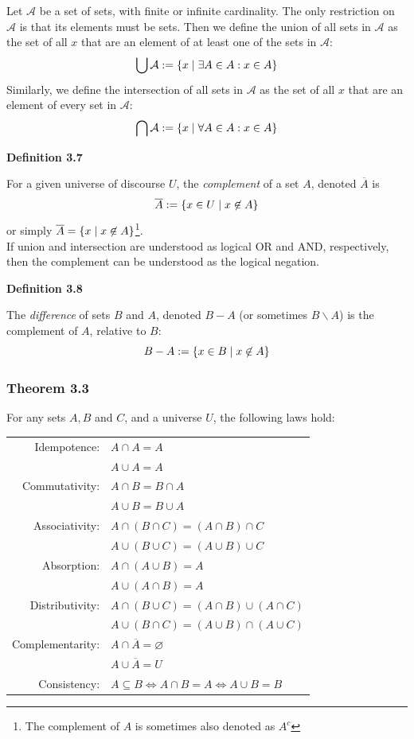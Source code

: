 \documentclass[a4paper]{report}
\newenvironment{definition}[1]{\begin{framed}\centerline{\textbf{Definition #1}}\noindent\hspace{-1.1mm}}{\end{framed}}
\DeclarePairedDelimiter\cur{\{}{\}}
\newcommand{\A}{\mathcal{A}}
\begin{document}
Let $\A$ be a set of sets, with finite or infinite cardinality. The only restriction on $\A$ is that its elements must be sets. Then we define the union of all sets in $\A$ as the set of all $x$ that are an element of at least one of the sets in $\A$:
\[\bigcup {\A} :=\cur{x\mid\exists A\in A:x\in A}\]
Similarly, we define the intersection of all sets in $\A$ as the set of all $x$ that are an element of every set in $\A$:
\[\bigcap {\A} :=\cur{x\mid\forall A\in A:x\in A}\]

\begin{definition}{3.7}
For a given universe of discourse $U$, the \emph{complement} of a set $A$, denoted $\overline{A}$ is \[\overline{A}:=\cur{x\in U\mid x\not\in A}\] or simply $\overline{A}=\cur{x\mid x\not\in A}$\footnote{The complement of $A$ is sometimes also denoted as $A^c$}.\\

If union and intersection are understood as logical OR and AND, respectively, then the complement can be understood as the logical negation.
\end{definition}

\begin{definition}{3.8}
The \emph{difference} of sets $B$ and $A$, denoted $B-A$ (or sometimes $B\backslash A$) is the complement of $A$, relative to $B$: \[B-A:=\cur{x\in B\mid x\not\in A}\] 
\end{definition}

\subsubsection*{Theorem 3.3}
For any sets $A,B$ and $C$, and a universe $U$, the following laws hold:\\
\begin{center}
\begin{tabular}{r l}
Idempotence: & $A\cap A=A$ \\
{}& $A\cup A=A$\\
Commutativity: & $A\cap B=B\cap A$\\
{}&$A\cup B=B\cup A$\\
Associativity: & $A\cap (B\cap C)=(A\cap B)\cap C$\\
{} & $A\cup (B\cup C)=(A\cup B)\cup C$\\
Absorption: & $A\cap (A\cup B)=A$\\
{}& $A\cup (A\cap B)=A$\\
Distributivity: & $A\cap (B\cup C)=(A\cap B)\cup (A\cap C)$\\
{}&$A\cup (B\cap C)=(A\cup B)\cap (A\cup C)$\\
Complementarity: & $A\cap\overline{A}=\varnothing$\\
{} & $A\cup\overline{A}= U$\\
Consistency: & $A\subseteq B\Longleftrightarrow A\cap B=A\Longleftrightarrow A\cup B=B$
\end{tabular}
\end{center}
\end{document}
